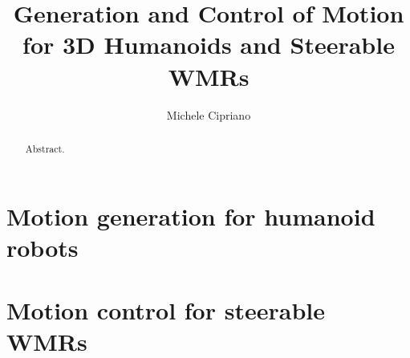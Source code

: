 \documentclass[oneside]{sapthesis}
\title{Generation and Control of Motion for 3D Humanoids and Steerable WMRs}
\author{Michele Cipriano}
\begin{document}
\frontmatter

\maketitle


\begin{abstract}
Abstract.
\end{abstract}

\tableofcontents

\listoffigures

\mainmatter




\part{Motion generation for humanoid robots}




\part{Motion control for steerable WMRs}





\backmatter
\cleardoublepage
{}

\end{document}
